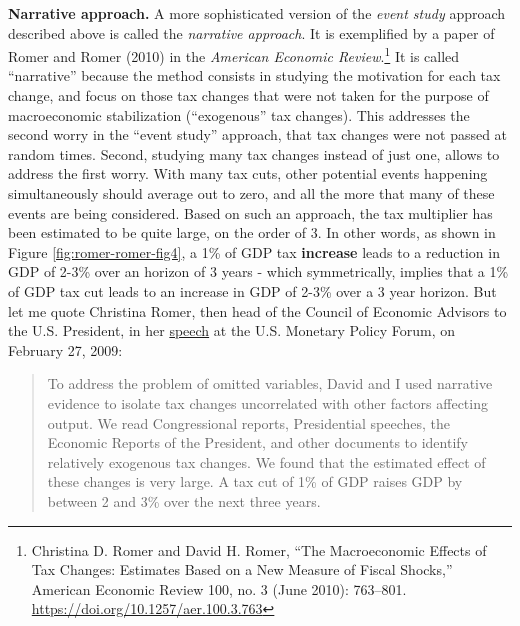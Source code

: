 \documentclass[]{book}
\let\rmarkdownfootnote\footnote%
\def\footnote{\protect\rmarkdownfootnote}
\begin{document}
\textbf{Narrative approach.} A more sophisticated version of the
\emph{event study} approach described above is called the
\emph{narrative approach}. It is exemplified by a paper of Romer and
Romer (2010) in the \emph{American Economic Review}.\footnote{Christina
  D. Romer and David H. Romer, ``The Macroeconomic Effects of Tax
  Changes: Estimates Based on a New Measure of Fiscal Shocks,'' American
  Economic Review 100, no. 3 (June 2010): 763--801.
  \url{https://doi.org/10.1257/aer.100.3.763}} It is called
``narrative'' because the method consists in studying the motivation for
each tax change, and focus on those tax changes that were not taken for
the purpose of macroeconomic stabilization (``exogenous'' tax changes).
This addresses the second worry in the ``event study'' approach, that
tax changes were not passed at random times. Second, studying many tax
changes instead of just one, allows to address the first worry. With
many tax cuts, other potential events happening simultaneously should
average out to zero, and all the more that many of these events are
being considered. Based on such an approach, the tax multiplier has been
estimated to be quite large, on the order of 3. In other words, as shown
in Figure \ref{fig:romer-romer-fig4}, a 1\% of GDP tax \textbf{increase}
leads to a reduction in GDP of 2-3\% over an horizon of 3 years - which
symmetrically, implies that a 1\% of GDP tax cut leads to an increase in
GDP of 2-3\% over a 3 year horizon. But let me quote Christina Romer,
then head of the Council of Economic Advisors to the U.S. President, in
her
\href{https://obamawhitehouse.archives.gov/administration/eop/cea/speeches-testimony/02272009/}{speech}
at the U.S. Monetary Policy Forum, on February 27, 2009:

\begin{quote}
To address the problem of omitted variables, David and I used narrative
evidence to isolate tax changes uncorrelated with other factors
affecting output. We read Congressional reports, Presidential speeches,
the Economic Reports of the President, and other documents to identify
relatively exogenous tax changes. We found that the estimated effect of
these changes is very large. A tax cut of 1\% of GDP raises GDP by
between 2 and 3\% over the next three years.
\end{quote}
\end{document}
